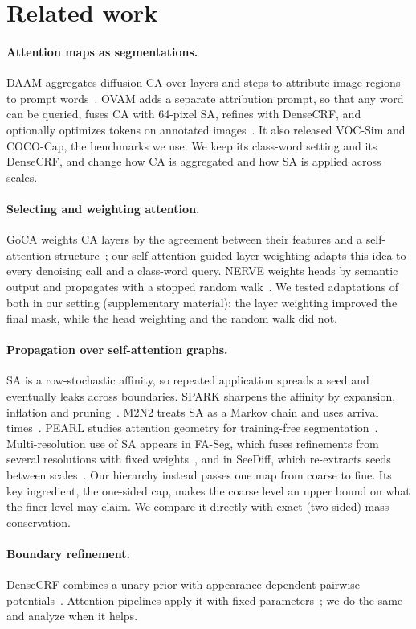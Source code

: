 \section{Related work}
\label{sec:related}
\paragraph{Attention maps as segmentations.}
DAAM aggregates diffusion CA over layers and steps to attribute image regions to prompt words~\cite{tang2023daam}. OVAM adds a separate attribution prompt, so that any word can be queried, fuses CA with 64-pixel SA, refines with DenseCRF, and optionally optimizes tokens on annotated images~\cite{marcosmanchon2024ovam}. It also released VOC-Sim and COCO-Cap, the benchmarks we use. We keep its class-word setting and its DenseCRF, and change how CA is aggregated and how SA is applied across scales.

\paragraph{Selecting and weighting attention.}
GoCA weights CA layers by the agreement between their features and a self-attention structure~\cite{meng2026making}; our self-attention-guided layer weighting adapts this idea to every denoising call and a class-word query. NERVE weights heads by semantic output and propagates with a stopped random walk~\cite{mahatha2025nerve}. We tested adaptations of both in our setting (supplementary material): the layer weighting improved the final mask, while the head weighting and the random walk did not.

\paragraph{Propagation over self-attention graphs.}
SA is a row-stochastic affinity, so repeated application spreads a seed and eventually leaks across boundaries. SPARK sharpens the affinity by expansion, inflation and pruning~\cite{mahatha2026spark}. M2N2 treats SA as a Markov chain and uses arrival times~\cite{karmann2025m2n2}. PEARL studies attention geometry for training-free segmentation~\cite{pei2026pearl}. Multi-resolution use of SA appears in FA-Seg, which fuses refinements from several resolutions with fixed weights~\cite{che2025faseg}, and in SeeDiff, which re-extracts seeds between scales~\cite{park2025seediff}. Our hierarchy instead passes one map from coarse to fine. Its key ingredient, the one-sided cap, makes the coarse level an upper bound on what the finer level may claim. We compare it directly with exact (two-sided) mass conservation.

\paragraph{Boundary refinement.}
DenseCRF combines a unary prior with appearance-dependent pairwise potentials~\cite{krahenbuhl2011crf}. Attention pipelines apply it with fixed parameters~\cite{marcosmanchon2024ovam}; we do the same and analyze when it helps.
